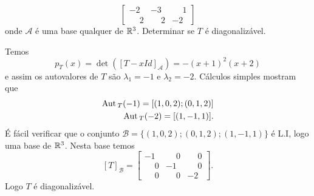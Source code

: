 \begin{exemplo}
\begin{enumerate}
\[\begin{bmatrix}
								-2 & -3 & \phantom{-}1\\
								\phantom{-}2 & \phantom{-}2 & -2
							\end{bmatrix}
		\]
		onde $\mathcal{A}$ \'e uma base qualquer de $\mathbb{R}^3$. Determinar se $T$ \'e diagonaliz\'avel.
		\begin{solucao}
		Temos
		\[
				p_T(x) = \det([T - xId]_\mathcal{A}) = -(x + 1)^2(x + 2)
			\]
			e assim os autovalores de $T$ s\~ao $\lambda_1 = -1$ e $\lambda_2 = -2$. C\'alculos simples mostram que
			\begin{align*}
				{\rm Aut\,}_T(-1) = [(1,0,2); (0,1,2)]\\
				{\rm Aut\,}_T(-2) = [(1,-1,1)].
			\end{align*}
			\'E f\'acil verificar que o conjunto $\mathcal{B} = \{(1,0,2); (0,1,2); (1,-1,1)\}$ \'e L.I, logo uma base de $\mathbb{R}^3$. Nesta base temos
			\[
				[T]_\mathcal{B} = \begin{bmatrix}
								-1 & \phantom{-}0 & \phantom{-}0\\
								\phantom{-}0 & -1 & \phantom{-}0\\
								\phantom{-}0 & \phantom{-}0 & -2
							\end{bmatrix}.
			\]
			Logo $T$ \'e diagonaliz\'avel.
		\end{solucao}
	\end{enumerate}
\end{exemplo}

